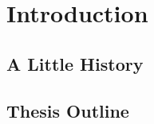 \chapter{Introduction}
\label{chap:intro}

\section{A Little History}
\label{sec:history}

\section{Thesis Outline}
\label{sec:outline}

